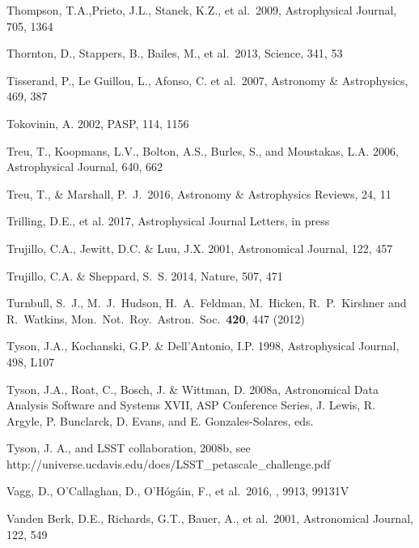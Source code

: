 \documentclass[twocolumn]{aastex61}
\begin{document}
\begin{thebibliography}{}
 Thompson, T.A.,Prieto, J.L., Stanek, K.Z., et al.~2009, Astrophysical Journal, 705, 1364

 Thornton, D., Stappers, B., Bailes, M., et al.~2013, Science, 341, 53

 Tisserand, P., Le Guillou, L., Afonso, C. et al.~2007, Astronomy \& Astrophysics, 469, 387

 Tokovinin, A. 2002, PASP, 114, 1156

 Treu, T., Koopmans, L.V., Bolton, A.S., Burles, S., and  Moustakas, L.A. 2006, Astrophysical Journal, 640, 662

 Treu, T., \& Marshall, P.~J.\ 2016, Astronomy \& Astrophysics Reviews, 24, 11

 Trilling, D.E., et al.  2017, Astrophysical Journal Letters, in press

 Trujillo, C.A., Jewitt, D.C. \& Luu, J.X. 2001, Astronomical Journal, 122, 457

 Trujillo, C.A. \& Sheppard, S.~S. 2014, Nature, 507, 471

 Turnbull, S.~J., M.~J.~Hudson, H.~A.~Feldman, M.~Hicken, R.~P.~Kirshner and R.~Watkins, Mon.\ Not.\ Roy.\ Astron.\ Soc.\  {\bf 420}, 447 (2012)

 Tyson, J.A., Kochanski, G.P. \& Dell'Antonio, I.P. 1998, Astrophysical Journal, 498, L107

 Tyson, J.A., Roat, C., Bosch, J. \& Wittman, D. 2008a, Astronomical Data Analysis Software and Systems XVII, ASP Conference Series, J. Lewis, R. Argyle, P. Bunclarck, D. Evans, and E. Gonzales-Solares, eds.

 Tyson, J. A., and LSST collaboration, 2008b, see http://universe.ucdavis.edu/docs/LSST\_petascale\_challenge.pdf

 Vagg, D., O'Callaghan, D., O'H{\'o}g{\'a}in, F., et al.\ 2016, \procspie, 9913, 99131V

 Vanden Berk, D.E., Richards, G.T., Bauer, A., et al.~2001, Astronomical Journal, 122, 549


\end{thebibliography}
\end{document}
